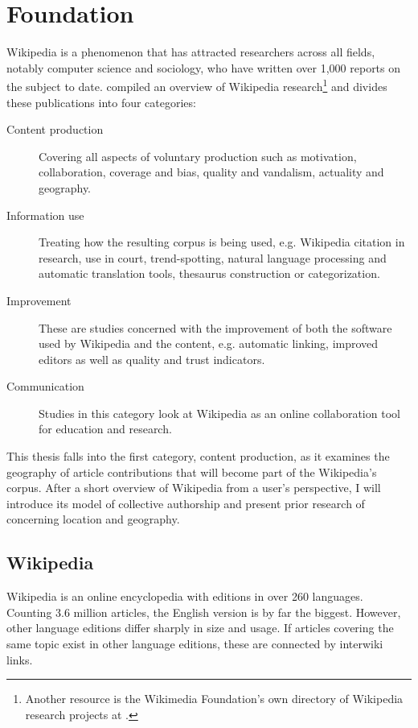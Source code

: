 \chapter{Foundation}\label{ch:foundation}

Wikipedia is a phenomenon that has attracted researchers across all fields, notably computer science and sociology, who have written over 1,000 reports on the subject to date.
\textcite{nielsen2011wikipedia} compiled an overview of Wikipedia research\footnote{Another resource is the Wikimedia Foundation's own directory of Wikipedia research projects at .} and divides these publications into four categories: 
\begin{description}
\item[Content production] Covering all aspects of voluntary production such as motivation, collaboration, coverage and bias, quality and vandalism, actuality and geography.
\item[Information use] Treating how the resulting corpus is being used, e.g. Wikipedia citation in research, use in court, trend-spotting, natural language processing and automatic translation tools, thesaurus construction or categorization.
\item[Improvement] These are studies concerned with the improvement of both the software used by Wikipedia and the content, e.g. automatic linking, improved editors as well as quality and trust indicators. 
\item[Communication] Studies in this category look at Wikipedia as an online collaboration tool for education and research. 
\end{description}

This thesis falls into the first category, content production, as it examines the geography of article contributions that will become part of the Wikipedia's corpus.
After a short overview of Wikipedia from a user's perspective, I will introduce its model of collective authorship and present prior research of concerning location and geography. 

\section{Wikipedia}\label{sec:wikipedia}

Wikipedia is an online encyclopedia with editions in over 260 languages.
Counting 3.6 million articles, the English version is by far the biggest.
However, other language editions differ sharply in size and usage.\cite{wikistats}
If articles covering the same topic exist in other language editions, these are connected by interwiki links.

